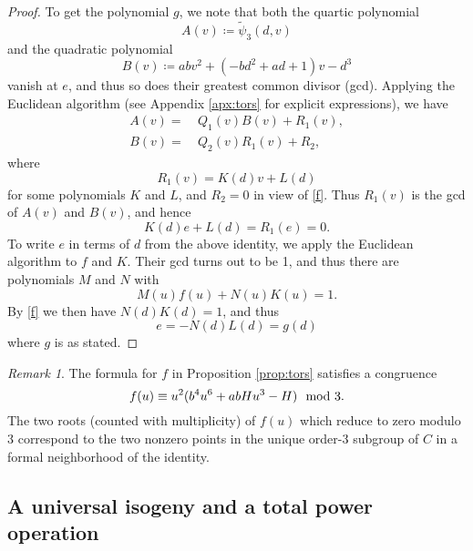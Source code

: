 \documentclass{gtpart}
\theoremstyle{definition}
\theoremstyle{remark}
\newtheorem{rmk}[thm]{Remark}
\newcommand{\Tp}{\widetilde{\psi}}
\newcommand{\md}{~~{\rm mod}~}
\begin{document}
\begin{proof}
 To get the polynomial $g$, we note that both the quartic polynomial 
 \[
  A(v) \coloneqq \Tp_3(d,v) 
 \]
 and the quadratic polynomial 
 \[
  B(v) \coloneqq a b v^2 + (-b d^2 + a d + 1) v - d^3 
 \]
 vanish at $e$, and thus so does their greatest common divisor (gcd).  
 Applying the Euclidean algorithm (see Appendix \ref{apx:tors} for 
 explicit expressions), we have 
 \begin{equation*}
 \begin{split}
  A(v) = & ~ Q_1(v) B(v) + R_1(v), \\
  B(v) = & ~ Q_2(v) R_1(v) + R_2, 
 \end{split}
 \end{equation*}
 where 
 \[
  R_1(v) = K(d) v + L(d) 
 \]
 for some polynomials $K$ and $L$, and $R_2 = 0$ in view of \eqref{f}.  
 Thus $R_1(v)$ is the gcd of $A(v)$ and $B(v)$, and hence 
 \[
  K(d) e + L(d) = R_1(e) = 0.  
 \]
 To write $e$ in terms of $d$ from the above identity, we apply the 
 Euclidean algorithm to $f$ and $K$.  Their gcd turns out to be 1, and 
 thus there are polynomials $M$ and $N$ with 
 \[
  M(u) f(u) + N(u) K(u) = 1.  
 \]
 By \eqref{f} we then have $N(d) K(d) = 1$, and thus 
 \[
  e = -N(d) L(d) = g(d) 
 \]
 where $g$ is as stated.  
\end{proof}

\begin{rmk}
\label{rmk:dmod3}
 The formula for $f$ in Proposition \ref{prop:tors} satisfies a 
 congruence 
 \[
  f(u) \equiv u^2 (b^4 u^6 + a b H u^3 - H) \md 3.  
 \]
 The two roots (counted with multiplicity) of $f(u)$ which reduce to 
 zero modulo 3 correspond to the two nonzero points in the unique 
 order-3 subgroup of $C$ in a formal neighborhood of the identity.  
\end{rmk}


\subsection{A universal isogeny and a total power operation}
\end{document}
